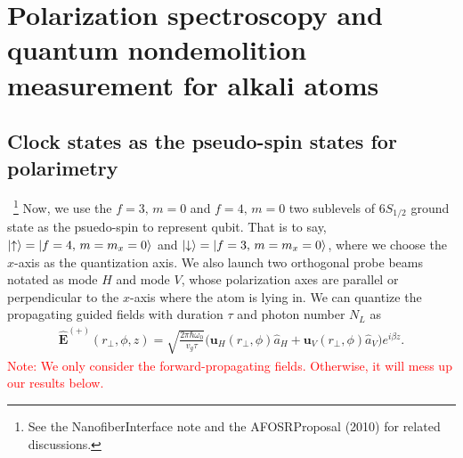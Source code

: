 \section{Polarization spectroscopy and quantum nondemolition measurement for alkali atoms}
\subsection{Clock states as the pseudo-spin states for polarimetry}~\footnote{See the NanofiberInterface note and the AFOSRProposal (2010) for related discussions.}
Now, we use the $ f=3,\,m=0 $ and $ f=4,\,m=0 $ two sublevels of $ 6S_{1/2} $ ground state as the psuedo-spin to represent qubit. That is to say, $ \lvert{\uparrow}\rangle=\lvert{f=4,\,m=m_x=0}\rangle $ and $ \lvert{\downarrow}\rangle=\lvert{f=3,\,m=m_x=0}\rangle $, where we choose the $ x $-axis as the quantization axis. We also launch two orthogonal probe beams notated as mode $ H $ and mode $ V $, whose polarization axes are parallel or perpendicular to the $ x $-axis where the atom is lying in. We can quantize the propagating guided fields with duration $ \tau $ and photon number $ N_L $ as
\begin{align} \label{Eq::FiberModeFunctions}
		\hat{\mathbf{E}}^{(+)}(r\!_\perp,\phi,z) = \sqrt{ \frac{2 \pi \hbar \omega_0}{ v_g \tau} } \big( \mathbf{u}_H(r\!_\perp,\phi) \hat{a}_H + \mathbf{u}_V(r\!_\perp,\phi) \hat{a}_V \big) e^{i \beta z}.
\end{align}
\textcolor{red}{Note: We only consider the forward-propagating fields. Otherwise, it will mess up our results below.}


